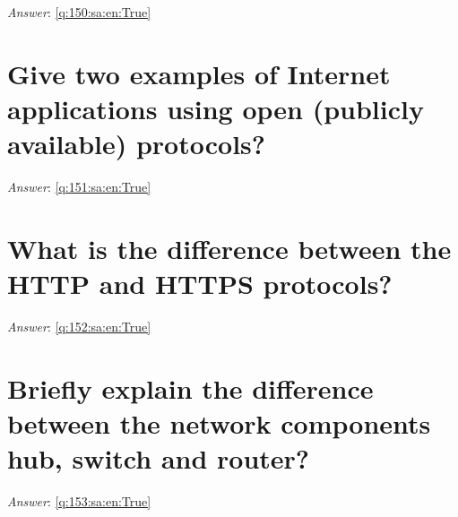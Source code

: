 \documentclass[a4paper,11pt,oneside]{book}
\begin{document}
\begin{sloppypar}
\label{q:150:sa:en:False}

\vspace{2cm}

\noindent\makebox[\textwidth]{\hrulefill}

\vspace{1cm}

\textit{Answer}: \autoref{q:150:sa:en:True}



\section{Give two examples of Internet applications using open (publicly available) protocols?}

\label{q:151:sa:en:False}

\vspace{2cm}

\noindent\makebox[\textwidth]{\hrulefill}

\vspace{1cm}

\textit{Answer}: \autoref{q:151:sa:en:True}



\section{What is the difference between the HTTP and HTTPS protocols?}

\label{q:152:sa:en:False}

\vspace{2cm}

\noindent\makebox[\textwidth]{\hrulefill}

\vspace{1cm}

\textit{Answer}: \autoref{q:152:sa:en:True}



\section{Briefly explain the difference between the network components hub, switch and router?}

\label{q:153:sa:en:False}

\vspace{2cm}

\noindent\makebox[\textwidth]{\hrulefill}

\vspace{1cm}

\textit{Answer}: \autoref{q:153:sa:en:True}




\end{sloppypar}
\end{document}
